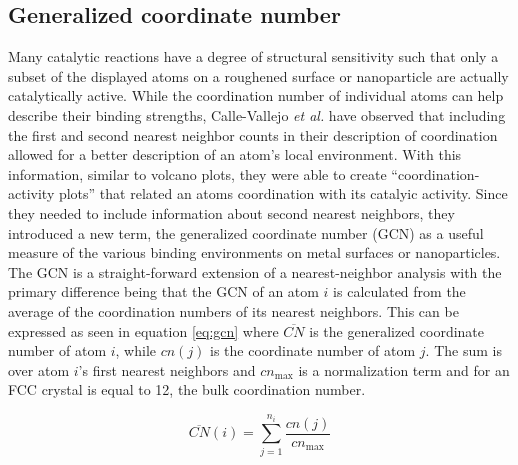 \subsection{Generalized coordinate number}
Many catalytic reactions have a degree of structural sensitivity such that only
a subset of the displayed atoms on a roughened surface or nanoparticle are
actually catalytically active. While the coordination number of individual
atoms can help describe their binding strengths, Calle-Vallejo {\it et al.}
have observed that including the first and second nearest neighbor counts in
their description of coordination allowed for a better description of an atom's
local environment.\citep{Calle-Vallejo:2015qq} With this information, similar to
volcano plots, they were able to create ``coordination-activity plots'' that
related an atoms coordination with its catalyic activity. Since they needed to
include information about second nearest neighbors, they introduced a new term,
the generalized coordinate number (GCN) as a useful measure of the various
binding environments on metal surfaces or nanoparticles. The GCN is a
straight-forward extension of a nearest-neighbor analysis with the primary
difference being that the GCN of an atom $i$ is calculated from the average of
the coordination numbers of its nearest neighbors. This can be expressed as
seen in equation \ref{eq:gcn} where $\overline{CN}$ is the generalized
coordinate number of atom $i$, while $cn(j)$ is the coordinate number of atom
$j$. The sum is over atom $i$'s first nearest neighbors and $cn_\textrm{max}$
is a normalization term and for an FCC crystal is equal to 12, the bulk
coordination number.

\begin{equation}
  \overline{CN}(i) = \sum_{j=1}^{n_i}\frac{cn(j)}{cn_{\textrm{max}}}
  \label{eq:gcn}
\end{equation}

